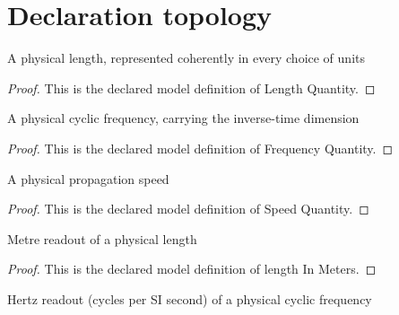 \section{Declaration topology}
\begin{definition}
  \label{def:physics:phyx-mini-0223:phyxminiproblems-problemphyxmini0223-lengthquantity}
  A physical length, represented coherently in every choice of units
\end{definition}
\begin{proof}
  This is the declared model definition of Length Quantity.
\end{proof}
\begin{definition}
  \label{def:physics:phyx-mini-0223:phyxminiproblems-problemphyxmini0223-frequencyquantity}
  A physical cyclic frequency, carrying the inverse-time dimension
\end{definition}
\begin{proof}
  This is the declared model definition of Frequency Quantity.
\end{proof}
\begin{definition}
  \label{def:physics:phyx-mini-0223:phyxminiproblems-problemphyxmini0223-speedquantity}
  A physical propagation speed
\end{definition}
\begin{proof}
  This is the declared model definition of Speed Quantity.
\end{proof}
\begin{definition}
  \label{def:physics:phyx-mini-0223:phyxminiproblems-problemphyxmini0223-lengthinmeters}
  Metre readout of a physical length
\end{definition}
\begin{proof}
  This is the declared model definition of length In Meters.
\end{proof}
\begin{definition}
  \label{def:physics:phyx-mini-0223:phyxminiproblems-problemphyxmini0223-frequencyinhertz}
  Hertz readout (cycles per SI second) of a physical cyclic frequency
\end{definition}

